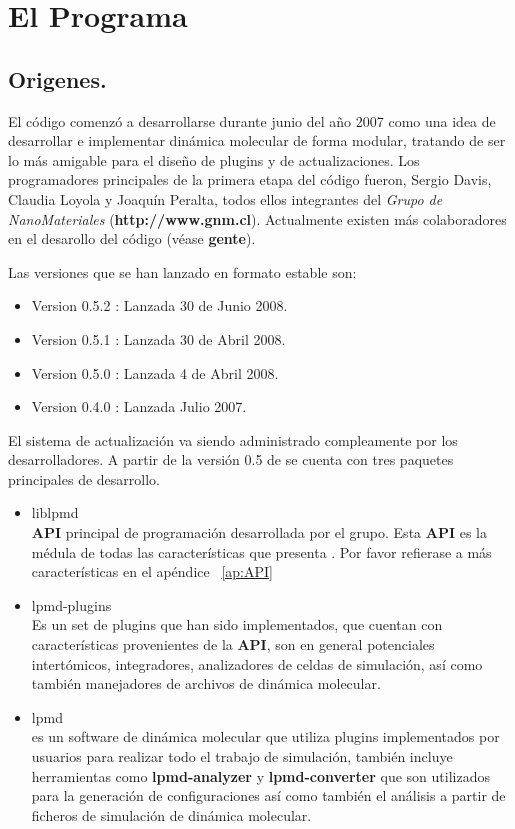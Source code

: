 \chapter{El Programa}
\label{chap:lpmd}

\section{Origenes.}

El c\'odigo \lpmd comenz\'o a desarrollarse durante junio del a\~no 2007 como una idea de desarrollar e implementar din\'amica molecular de forma modular, tratando de ser lo m\'as amigable para el dise\~no de plugins y de actualizaciones. Los programadores principales de la primera etapa del c\'odigo fueron, Sergio Davis, Claudia Loyola y Joaqu\'in Peralta, todos ellos integrantes del \textit{Grupo de NanoMateriales} (\textbf{http://www.gnm.cl}). Actualmente existen m\'as colaboradores en el desarollo del c\'odigo (v\'ease \textbf{gente}).

Las versiones que se han lanzado en formato estable son:

\begin{itemize}
 \item Version 0.5.2 : Lanzada 30 de Junio 2008.
 \item Version 0.5.1 : Lanzada 30 de Abril 2008.
 \item Version 0.5.0 : Lanzada 4 de Abril 2008.
 \item Version 0.4.0 : Lanzada Julio 2007.
\end{itemize}

El sistema de actualizaci\'on va siendo administrado compleamente por los desarrolladores. A partir de la versi\'on 0.5 de \lpmd se cuenta con tres paquetes principales de desarrollo.

\begin{itemize}
 \item liblpmd \\
\textbf{API} principal de programaci\'on desarrollada por el grupo. Esta \textbf{API} es la m\'edula de todas las caracter\'isticas que presenta \lpmd. Por favor refierase a m\'as caracter\'isticas en el ap\'endice ~\ref{ap:API}
 \item lpmd-plugins \\
Es un set de plugins que han sido implementados, que cuentan con caracter\'isticas provenientes de la \textbf{API}, son en general potenciales intert\'omicos, integradores, analizadores de celdas de simulaci\'on, as\'i como tambi\'en manejadores de archivos de din\'amica molecular.
 \item lpmd \\
\lpmd es un software de din\'amica molecular que utiliza plugins implementados por usuarios para realizar todo el trabajo de simulaci\'on, tambi\'en incluye herramientas como \textbf{lpmd-analyzer} y \textbf{lpmd-converter} que son utilizados para la generaci\'on de configuraciones as\'i como tambi\'en el an\'alisis a partir de ficheros de simulaci\'on de din\'amica molecular.
\end{itemize}

